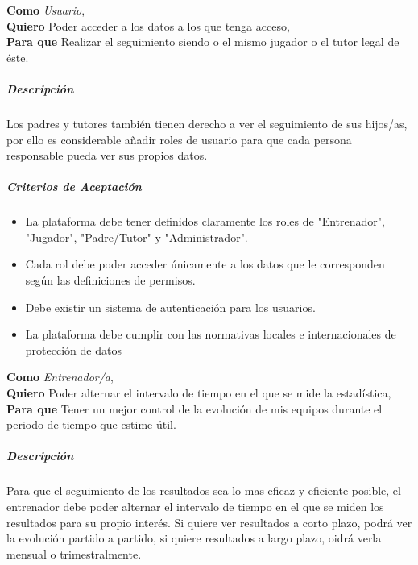 \begin{tcolorbox}[title=Historia de Usuario 9: Acceso a roles de usuario]
\textbf{Como} \textit{Usuario},\\
\textbf{Quiero} Poder acceder a los datos a los que tenga acceso,\\
\textbf{Para que} Realizar el seguimiento siendo o el mismo jugador o el tutor legal de éste.
\end{tcolorbox}

\subparagraph{Descripción}
Los padres y tutores también tienen derecho a ver el seguimiento de sus hijos/as, por ello es considerable añadir roles de usuario para que cada persona responsable pueda ver sus propios datos.

\subparagraph{Criterios de Aceptación}
\begin{itemize}
    \item La plataforma debe tener definidos claramente los roles de "Entrenador", "Jugador", "Padre/Tutor" y "Administrador".
    \item Cada rol debe poder acceder únicamente a los datos que le corresponden según las definiciones de permisos.
    \item Debe existir un sistema de autenticación para los usuarios.
    \item La plataforma debe cumplir con las normativas locales e internacionales de protección de datos
\end{itemize}

\begin{tcolorbox}[title=Historia de Usuario 10: Intervalos Estadísticos para el menú]
\textbf{Como} \textit{Entrenador/a},\\
\textbf{Quiero} Poder alternar el intervalo de tiempo en el que se mide la estadística,\\
\textbf{Para que} Tener un mejor control de la evolución de mis equipos durante el periodo de tiempo que estime útil.
\end{tcolorbox}

\subparagraph{Descripción}
Para que el seguimiento de los resultados sea lo mas eficaz y eficiente posible, el entrenador debe poder alternar el intervalo de tiempo en el que se miden los resultados para su propio interés. Si quiere ver resultados a corto plazo, podrá ver la evolución partido a partido, si quiere resultados a largo plazo, oidrá verla mensual o trimestralmente.

